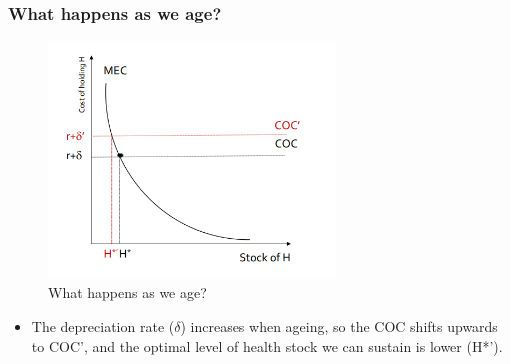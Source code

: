 \subsubsection{What happens as we age?}
\begin{figure}[H]%
                \centering
                \includegraphics[width=3in]{images/ch3/26.png}
                \caption{What happens as we age?}
                \label{fig:label}
            \end{figure}

\begin{itemize}
        \item The depreciation rate ($\delta$) increases when ageing, so the COC shifts upwards to COC', and the optimal level of health stock we can sustain is lower (H*').
\end{itemize} 


